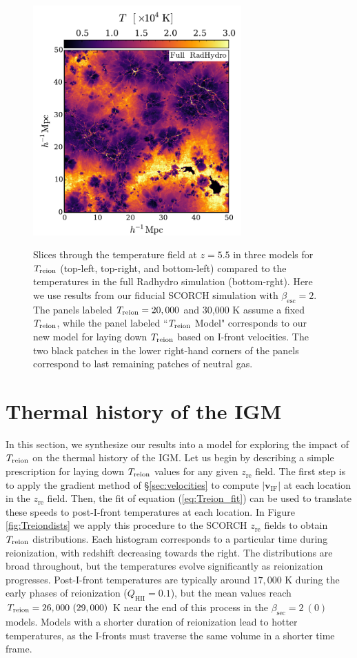 \documentclass[twocolumn]{aastex62}
\newcommand{\zreion}{z_{\mathrm{re}}}
\newcommand{\Treion}{T_{\rm reion}}
\newcommand{\vIF}{v_{\mathrm{IF}}}
\begin{document}
\begin{figure}
{\includegraphics[width=8.0cm]{fig9d.pdf}
}
\caption{Slices through the temperature field at $z=5.5$ in three models for $\Treion$ (top-left, top-right, and bottom-left) compared to the temperatures in the full Radhydro simulation (bottom-rght).  Here we use results from our fiducial SCORCH simulation with $\beta_{\mathrm{esc}} =2$.  The panels labeled $\Treion=20,000$ and 30,000 K assume a fixed $\Treion$, while the panel labeled ``$\Treion$ Model" corresponds to our new model for laying down $\Treion$ based on I-front velocities.  The two black patches in the lower right-hand corners of the panels correspond to last remaining patches of neutral gas.   }
\label{fig:Tslices}
\end{figure}



\section{Thermal history of the IGM}
\label{sec:implications}

In this section, we synthesize our results into a model for exploring the impact of $\Treion$ on the thermal history of the IGM.  Let us begin by describing a simple prescription for laying down $\Treion$ values for any given $\zreion$ field. The first step is to apply the gradient method of \S \ref{sec:velocities} to compute $|\mathbf{\vIF}|$ at each location in the $\zreion$ field.  Then, the fit of equation (\ref{eq:Treion_fit}) can be used to translate these speeds to post-I-front temperatures at each location.  In Figure \ref{fig:Treiondists} we apply this procedure to the SCORCH $\zreion$ fields to obtain $\Treion$ distributions.  Each histogram corresponds to a particular time during reionization, with redshift decreasing towards the right.  The distributions are broad throughout, but the temperatures evolve significantly as reionization progresses.  Post-I-front temperatures are typically around $17,000$ K during the early phases of reionization ($Q_{\mathrm{HII}} = 0.1$), but the mean values reach $\Treion = 26,000~(29,000)$ K near the end of this process in the $\beta_{\mathrm{sec}} = 2~(0)$ models.  Models with a shorter duration of reionization lead to hotter temperatures, as the I-fronts must traverse the same volume in a shorter time frame.      
\end{document}

